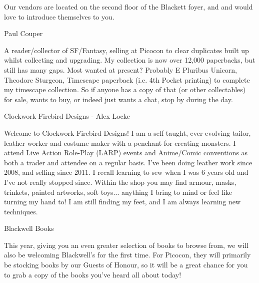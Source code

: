 Our vendors are located on the second floor of the Blackett foyer, and and would love to introduce themselves to you.

\vspace{5mm}

{\Large Paul Couper}

A reader/collector of SF/Fantasy, selling at Picocon to clear duplicates built up whilst collecting and upgrading. My collection is now over 12,000 paperbacks, but still has many gaps. Most wanted at present? Probably E Pluribus Unicorn, Theodore Sturgeon, Timescape paperback (i.e. 4th Pocket printing) to complete my timescape collection. So if anyone has a copy of that (or other collectables) for sale, wants to buy, or indeed just wants a chat, stop by during the day.

\vspace{5mm}

{\Large Clockwork Firebird Designs - Alex Locke }

Welcome to Clockwork Firebird Designs! I am a self-taught, ever-evolving tailor, leather worker and costume maker with a penchant for creating monsters. I attend Live Action Role-Play (LARP) events and Anime/Comic conventions as both a trader and attendee on a regular basis. I've been doing leather work since 2008, and selling since 2011. I recall learning to sew when I was 6 years old and I've not really stopped since. Within the shop you may find armour, masks, trinkets, painted artworks, soft toys... anything I bring to mind or feel like turning my hand to! I am still finding my feet, and I am always learning new techniques.

\vspace{5mm}

{\Large Blackwell Books }

This year, giving you an even greater selection of books to browse from, we will also be welcoming Blackwell's for the first time. For Picocon, they will primarily be stocking books by our Guests of Honour, so it will be a great chance for you to grab a copy of the books you've heard all about today!